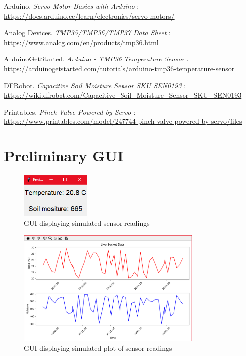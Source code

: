 \documentclass[a4paper,11pt]{article}
\begin{document}
\begin{thebibliography}{9}

Arduino. \textit{Servo Motor Basics with Arduino} : \\
\url{https://docs.arduino.cc/learn/electronics/servo-motors/}

Analog Devices. \textit{TMP35/TMP36/TMP37 Data Sheet} : \\
\url{https://www.analog.com/en/products/tmp36.html} 

ArduinoGetStarted. \textit{Arduino - TMP36 Temperature Sensor} : \\
\url{https://arduinogetstarted.com/tutorials/arduino-tmp36-temperature-sensor}

DFRobot. \textit{Capacitive Soil Moisture Sensor SKU SEN0193} : \\
\url{https://wiki.dfrobot.com/Capacitive_Soil_Moisture_Sensor_SKU_SEN0193}

Printables. \textit{Pinch Valve Powered by Servo} : \\
\url{https://www.printables.com/model/247744-pinch-valve-powered-by-servo/files}

\end{thebibliography}

\newpage
\appendix

\section{Preliminary GUI}

\begin{figure}[H]
    \centering
    \includegraphics[width=0.3\textwidth]{Dummy Readings.png}
    \caption{GUI displaying simulated sensor readings}
    \label{fig:prelim_GUI_readings}
\end{figure}

\begin{figure}[H]
    \centering
    \includegraphics[width=0.8\textwidth]{Dummy Plotting.png}
    \caption{GUI displaying simulated plot of sensor readings}
    \label{fig:prelim_GUI_plot}
\end{figure}
\end{document}
